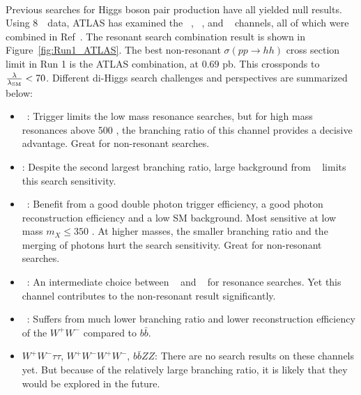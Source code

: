 \paragraph{}
Previous searches for Higgs boson pair production have all yielded null results. Using 8~\TeV\ data, ATLAS has examined the \bbbb~\cite{Aad:2015uka}, \bbgg~\cite{HIGG-2013-29}, \bbtautau and \WWgg~ channels, all of which were combined in Ref~\cite{Aad:2015xja}. The resonant search combination result is shown in Figure~\ref{fig:Run1_ATLAS}. The best non-resonant $\sigma(pp \to hh)$ cross section limit in Run 1 is the ATLAS combination, at $0.69$ pb. This crossponds to $\frac{\rm \lambda}{\rm \lambda_{\rm SM}} <70$. Different di-Higgs search challenges and perspectives are summarized below:
\begin{itemize}
	\item \bbbb~: Trigger limits the low mass resonance searches, but for high mass resonances above 500 \GeV, the branching ratio of this channel provides a decisive advantage. Great for non-resonant searches.
	\item \bbWW: Despite the second largest branching ratio, large background from \ttbar~ limits this search sensitivity.
	\item \bbgg~: Benefit from a good double photon trigger efficiency, a good photon reconstruction efficiency and a low SM background. Most sensitive at low mass $m_{X} \leq 350$ \GeV. At higher masses, the smaller branching ratio and the merging of photons hurt the search sensitivity. Great for non-resonant searches.
	\item \bbtautau~: An intermediate choice between \bbbb~ and \bbgg~ for resonance searches. Yet this channel contributes to the non-resonant result significantly.
	\item \WWgg~: Suffers from much lower branching ratio and lower reconstruction efficiency of the $W^+W^-$ compared to $b\bar{b}$.
	\item $W^+W^-\tau\tau$, $W^+W^-W^+W^-$, $b\bar{b}ZZ$: There are no search results on these channels yet. But because of the relatively large branching ratio, it is likely that they would be explored in the future.
\end{itemize}

